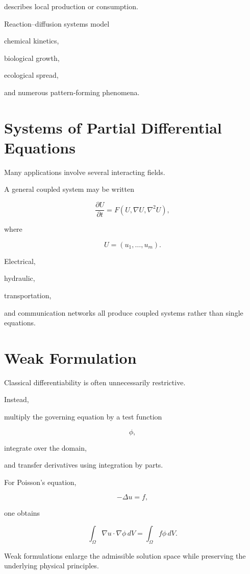 \documentclass[11pt,fleqn]{book}
\numberwithin{equation}{chapter}
\theoremstyle{plain}
\theoremstyle{definition}
\theoremstyle{remark}
\begin{document}
describes local production or consumption.

Reaction--diffusion systems model

chemical kinetics,

biological growth,

ecological spread,

and numerous pattern-forming phenomena.


\section{Systems of Partial Differential Equations}

Many applications involve several interacting fields.

A general coupled system may be written

\[
\boxed{
\frac{\partial U}{\partial t}
=
F
\left(
U,
\nabla U,
\nabla^2U
\right),
}
\]

where

\[
U
=
(u_1,\ldots,u_m).
\]

Electrical,

hydraulic,

transportation,

and communication networks all produce coupled systems rather than single
equations.


\section{Weak Formulation}

Classical differentiability is often unnecessarily restrictive.

Instead,

multiply the governing equation by a test function

\[
\phi,
\]

integrate over the domain,

and transfer derivatives using integration by parts.

For Poisson's equation,

\[
-\Delta u=f,
\]

one obtains

\[
\boxed{
\int_\Omega
\nabla u\cdot\nabla\phi
\,dV
=
\int_\Omega
f\phi
\,dV.
}
\]

Weak formulations enlarge the admissible solution space while preserving
the underlying physical principles.
\end{document}
